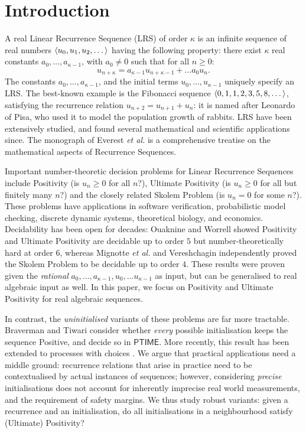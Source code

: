 \section{Introduction}
\label{section:intro}
A real Linear Recurrence Sequence (LRS) of order $\kappa$ is an infinite sequence of real numbers $\langle u_0, u_1, u_2, \dots\rangle$ having the following property: there exist $\kappa$ real constants $a_{0}, \dots, a_{\kappa-1}$, with $a_0 \ne 0$ such that for all $n \ge 0$:
\begin{equation}
u_{n+\kappa} = a_{\kappa-1}u_{n+\kappa-1} + \dots a_0 u_n.
\end{equation}
The constants $a_0, \dots, a_{\kappa-1}$, and the initial terms $u_0, \dots, u_{\kappa-1}$ uniquely specify an LRS. The best-known example is the Fibonacci sequence $\langle0, 1, 1, 2, 3, 5, 8, \dots\rangle$, satisfying the recurrence relation $u_{n+2} = u_{n+1} + u_n$: it is named after Leonardo of Pisa, who used it to model the population growth of rabbits. LRS have been extensively studied, and found several mathematical and scientific applications since. The monograph of Everest \textit{et al.} \cite{Everest2003RecurrenceS} is a comprehensive treatise on the mathematical aspects of Recurrence Sequences.

Important number-theoretic decision problems for Linear Recurrence Sequences include Positivity (is $u_n \ge 0$ for all $n$?), Ultimate Positivity (is $u_n \ge 0$ for all but finitely many $n$?) and the closely related Skolem Problem (is $u_n = 0$ for some $n$?). These problems have applications in software verification, probabilistic model checking, discrete dynamic systems, theoretical biology, and economics. Decidability has been open for decades: Ouaknine and Worrell \cite{joeljames3} showed Positivity and Ultimate Positivity are decidable up to order $5$ but number-theoretically hard at order $6$, whereas Mignotte \textit{et al.} \cite{mignotte} and Vereshchagin \cite{vereshchagin} independently proved the Skolem Problem to be decidable up to order $4$. These results were proven given the \textit{rational} $a_0, \dots, a_{\kappa-1}, u_0, \dots u_{\kappa-1}$ as input, but can be generalised to real algebraic input as well. In this paper, we focus on Positivity and Ultimate Positivity for real algebraic sequences.

In contrast, the \textit{uninitialised} variants of these problems are far more tractable. Braverman \cite{Braverman06} and Tiwari \cite{Tiwari04} consider whether \textit{every} possible initialisation keeps the sequence Positive, and decide so in $\mathsf{PTIME}$. More recently, this result has been extended to processes with choices \cite{AGV18}. We argue that practical applications need a middle ground: recurrence relations that arise in practice need to be contextualised by actual instances of sequences; however, considering \textit{precise} initialisations does not account for inherently imprecise real world measurements, and the requirement of safety margins. We thus study robust variants: given a recurrence and an initialisation, do all initialisations in a neighbourhood satisfy (Ultimate) Positivity?

